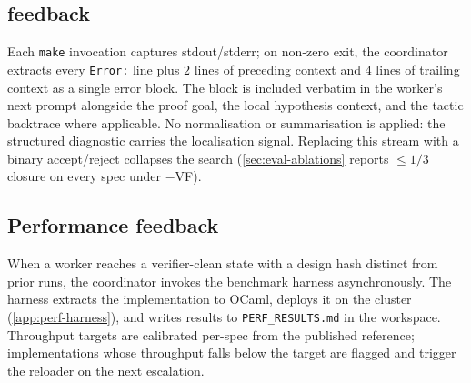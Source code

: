 \subsection{\coq{} feedback}
\label{app:feedback}

Each \texttt{make} invocation captures stdout/stderr; on non-zero exit, the coordinator extracts every \texttt{Error:} line plus $2$ lines of preceding context and $4$ lines of trailing context as a single error block. The block is included verbatim in the worker's next prompt alongside the proof goal, the local hypothesis context, and the tactic backtrace where applicable. No normalisation or summarisation is applied: the structured \coq{} diagnostic carries the localisation signal. Replacing this stream with a binary accept/reject collapses the search (\cref{sec:eval-ablations} reports $\le 1/3$ closure on every \coq{} spec under $-$VF).

\subsection{Performance feedback}
\label{app:bench-signal}

When a worker reaches a verifier-clean state with a design hash distinct from prior runs, the coordinator invokes the benchmark harness asynchronously. The harness extracts the implementation to OCaml, deploys it on the cluster (\cref{app:perf-harness}), and writes results to \texttt{PERF\_RESULTS.md} in the workspace. Throughput targets are calibrated per-spec from the published reference; implementations whose throughput falls below the target are flagged and trigger the reloader on the next escalation.
